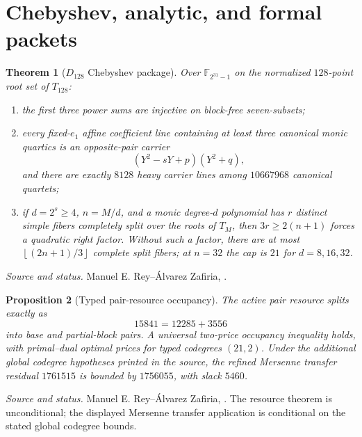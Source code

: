 \documentclass[11pt,a4paper]{amsart}
\numberwithin{equation}{section}
\newtheorem{theorem}{Theorem}[section]
\newtheorem{proposition}[theorem]{Proposition}
\theoremstyle{remark}
\newcommand{\F}{\mathbb F}
\newcommand{\floor}[1]{\left\lfloor#1\right\rfloor}
\newcommand{\source}[1]{\par\smallskip\noindent\textit{Source and status.} #1\par}
\begin{document}
\section{Chebyshev, analytic, and formal packets}

\begin{theorem}[$D_{128}$ Chebyshev package]\label{thm:d128}
Over $\F_{2^{31}-1}$ on the normalized $128$-point root set of $T_{128}$:
\begin{enumerate}[label=\textup{(\roman*)},leftmargin=*]
\item the first three power sums are injective on block-free seven-subsets;
\item every fixed-$e_1$ affine coefficient line containing at least three canonical monic quartics is an opposite-pair carrier
\[
 (Y^2-sY+p)(Y^2+q),
\]
and there are exactly $8128$ heavy carrier lines among $10667968$ canonical quartets;
\item if $d=2^s\ge4$, $n=M/d$, and a monic degree-$d$ polynomial has $r$ distinct simple fibers completely split over the roots of $T_M$, then $3r\ge2(n+1)$ forces a quadratic right factor.  Without such a factor, there are at most $\floor{(2n+1)/3}$ complete split fibers; at $n=32$ the cap is $21$ for $d=8,16,32$.
\end{enumerate}
\end{theorem}
\source{Manuel E. Rey--\'Alvarez Zafiria, \cite{ReyD128Inject26,ReyD128Quartic26,ReyChebDescent26}.}

\begin{proposition}[Typed pair-resource occupancy]\label{prop:pair-resource}
The active pair resource splits exactly as
\[
 15841=12285+3556
\]
into base and partial-block pairs.  A universal two-price occupancy inequality holds, with primal--dual optimal prices for typed codegrees $(21,2)$.  Under the additional global codegree hypotheses printed in the source, the refined Mersenne transfer residual $1761515$ is bounded by $1756055$, with slack $5460$.
\end{proposition}
\source{Manuel E. Rey--\'Alvarez Zafiria, \cite{ReyPairResource26}.  The resource theorem is unconditional; the displayed Mersenne transfer application is conditional on the stated global codegree bounds.}
\end{document}
